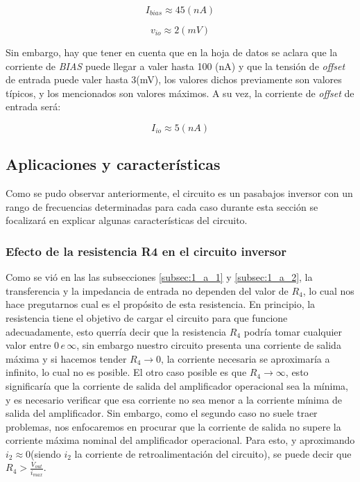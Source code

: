 \[
I_{bias}\approx45(nA)
\]
 
\[
v_{io}\approx2(mV)
\]

Sin embargo, hay que tener en cuenta que en la hoja de datos se aclara
que la corriente de \emph{BIAS} puede llegar a valer hasta 100 (nA)
y que la tensión de \emph{offset} de entrada puede valer hasta 3(mV),
los valores dichos previamente son valores típicos, y los mencionados
son valores máximos. A su vez, la corriente de \emph{offset} de entrada
será:

\[
I_{io}\approx5(nA)
\]

\subsection{Aplicaciones y características}

Como se pudo observar anteriormente, el circuito es un pasabajos inversor
con un rango de frecuencias determinadas para cada caso durante esta
sección se focalizará en explicar algunas características del circuito.

\subsubsection{Efecto de la resistencia R4 en el circuito inversor}

Como se vió en las las subsecciones \ref{subsec:1_a_1} y \ref{subsec:1_a_2},
la transferencia y la impedancia de entrada no dependen del valor
de $R_{4}$, lo cual nos hace pregutarnos cual es el propósito de
esta resistencia. En principio, la resistencia tiene el objetivo de
cargar el circuito para que funcione adecuadamente, esto querría decir
que la resistencia $R_{4}$ podría tomar cualquier valor entre $0\,e\,\infty$,
sin embargo nuestro circuito presenta una corriente de salida máxima
y si hacemos tender $R_{4}\longrightarrow0$, la corriente necesaria
se aproximaría a infinito, lo cual no es posible. El otro caso posible
es que $R_{4}\longrightarrow\infty$, esto significaría que la corriente
de salida del amplificador operacional sea la mínima, y es necesario
verificar que esa corriente no sea menor a la corriente mínima de
salida del amplificador. Sin embargo, como el segundo caso no suele
traer problemas, nos enfocaremos en procurar que la corriente de salida
no supere la corriente máxima nominal del amplificador operacional.
Para esto, y aproximando $i_{2}\approx0$(siendo $i_{2}$ la corriente
de retroalimentación del circuito), se puede decir que $R_{4}>\frac{V_{out}}{i_{max}}$.

